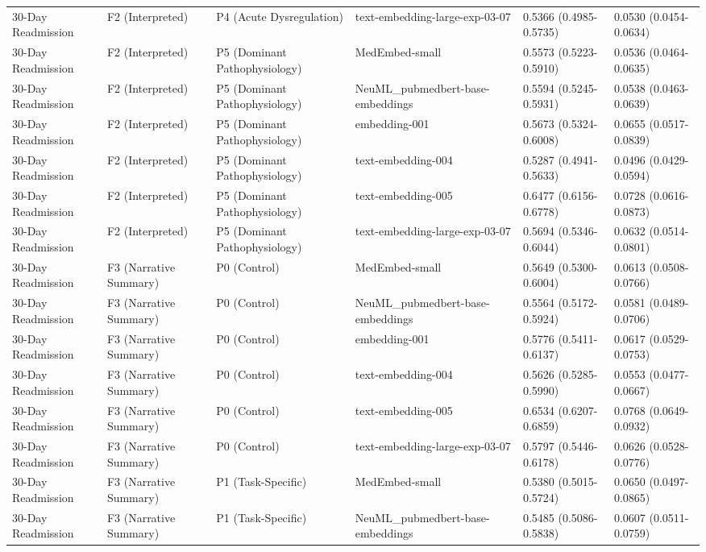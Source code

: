 \documentclass[border=0pt]{standalone}
\begin{document}
\begin{adjustbox}{width=\textwidth}
\begin{tabular}{llllll}
30-Day Readmission & F2 (Interpreted) & P4 (Acute Dysregulation) & text-embedding-large-exp-03-07 & 0.5366 (0.4985-0.5735) & 0.0530 (0.0454-0.0634) \\
30-Day Readmission & F2 (Interpreted) & P5 (Dominant Pathophysiology) & MedEmbed-small & 0.5573 (0.5223-0.5910) & 0.0536 (0.0464-0.0635) \\
30-Day Readmission & F2 (Interpreted) & P5 (Dominant Pathophysiology) & NeuML\_pubmedbert-base-embeddings & 0.5594 (0.5245-0.5931) & 0.0538 (0.0463-0.0639) \\
30-Day Readmission & F2 (Interpreted) & P5 (Dominant Pathophysiology) & embedding-001 & 0.5673 (0.5324-0.6008) & 0.0655 (0.0517-0.0839) \\
30-Day Readmission & F2 (Interpreted) & P5 (Dominant Pathophysiology) & text-embedding-004 & 0.5287 (0.4941-0.5633) & 0.0496 (0.0429-0.0594) \\
30-Day Readmission & F2 (Interpreted) & P5 (Dominant Pathophysiology) & text-embedding-005 & 0.6477 (0.6156-0.6778) & 0.0728 (0.0616-0.0873) \\
30-Day Readmission & F2 (Interpreted) & P5 (Dominant Pathophysiology) & text-embedding-large-exp-03-07 & 0.5694 (0.5346-0.6044) & 0.0632 (0.0514-0.0801) \\
30-Day Readmission & F3 (Narrative Summary) & P0 (Control) & MedEmbed-small & 0.5649 (0.5300-0.6004) & 0.0613 (0.0508-0.0766) \\
30-Day Readmission & F3 (Narrative Summary) & P0 (Control) & NeuML\_pubmedbert-base-embeddings & 0.5564 (0.5172-0.5924) & 0.0581 (0.0489-0.0706) \\
30-Day Readmission & F3 (Narrative Summary) & P0 (Control) & embedding-001 & 0.5776 (0.5411-0.6137) & 0.0617 (0.0529-0.0753) \\
30-Day Readmission & F3 (Narrative Summary) & P0 (Control) & text-embedding-004 & 0.5626 (0.5285-0.5990) & 0.0553 (0.0477-0.0667) \\
30-Day Readmission & F3 (Narrative Summary) & P0 (Control) & text-embedding-005 & 0.6534 (0.6207-0.6859) & 0.0768 (0.0649-0.0932) \\
30-Day Readmission & F3 (Narrative Summary) & P0 (Control) & text-embedding-large-exp-03-07 & 0.5797 (0.5446-0.6178) & 0.0626 (0.0528-0.0776) \\
30-Day Readmission & F3 (Narrative Summary) & P1 (Task-Specific) & MedEmbed-small & 0.5380 (0.5015-0.5724) & 0.0650 (0.0497-0.0865) \\
30-Day Readmission & F3 (Narrative Summary) & P1 (Task-Specific) & NeuML\_pubmedbert-base-embeddings & 0.5485 (0.5086-0.5838) & 0.0607 (0.0511-0.0759) \\

\end{tabular}
\end{adjustbox}
\end{document}
